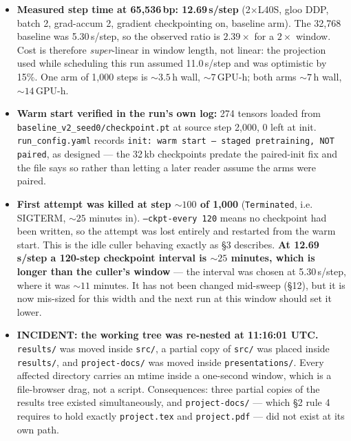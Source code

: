 \documentclass[11pt,a4paper]{article}
\newcommand{\code}[1]{\texttt{\small #1}}
\begin{document}
\begin{itemize}

\item \textbf{Measured step time at 65{,}536\,bp: 12.69\,s/step} (2$\times$L40S,
gloo DDP, batch 2, grad-accum 2, gradient checkpointing on, baseline arm). The
32{,}768 baseline was 5.30\,s/step, so the observed ratio is
$\mathbf{2.39\times}$ for a $2\times$ window. Cost is therefore
\emph{super}-linear in window length, not linear: the projection used while
scheduling this run assumed 11.0\,s/step and was optimistic by 15\%. One arm of
1{,}000 steps is ${\sim}3.5$\,h wall, ${\sim}7$\,GPU-h; both arms
${\sim}7$\,h wall, ${\sim}14$\,GPU-h.

\item \textbf{Warm start verified in the run's own log:} 274 tensors loaded
from \code{baseline\_v2\_seed0/checkpoint.pt} at source step 2{,}000, 0 left at
init. \code{run\_config.yaml} records
\code{init: warm start -- staged pretraining, NOT paired}, as designed --- the
32\,kb checkpoints predate the paired-init fix and the file says so rather than
letting a later reader assume the arms were paired.

\item \textbf{First attempt was killed at step ${\sim}100$ of 1{,}000}
(\code{Terminated}, i.e. SIGTERM, ${\sim}25$ minutes in). \code{--ckpt-every
120} means no checkpoint had been written, so the attempt was lost entirely and
restarted from the warm start. This is the idle culler behaving exactly as
\S3 describes. \textbf{At 12.69\,s/step a 120-step checkpoint interval is
${\sim}25$ minutes, which is longer than the culler's window} --- the interval
was chosen at 5.30\,s/step, where it was ${\sim}11$ minutes. It has not been
changed mid-sweep (\S12), but it is now mis-sized for this width and the next
run at this window should set it lower.

\item \textbf{INCIDENT: the working tree was re-nested at 11:16:01 UTC.}
\code{results/} was moved inside \code{src/}, a partial copy of \code{src/} was
placed inside \code{results/}, and \code{project-docs/} was moved inside
\code{presentations/}. Every affected directory carries an mtime inside a
one-second window, which is a file-browser drag, not a script. Consequences:
three partial copies of the results tree existed simultaneously, and
\code{project-docs/} --- which \S2 rule 4 requires to hold exactly
\code{project.tex} and \code{project.pdf} --- did not exist at its own path.


\end{itemize}
\end{document}
